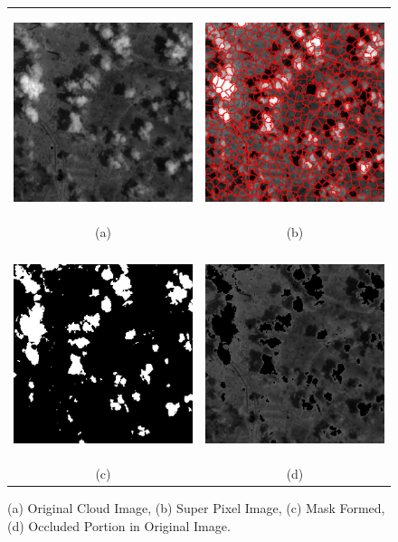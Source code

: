 \documentclass[a4paper, 15pt]{article}
\begin{document}
	\begin{figure}[!h]
		\centering 
		\begin{tabular}{cc}
			\includegraphics[width=6cm, height=6cm]{cloudSample.png} &\hspace{-8pt}
			\includegraphics[width=6cm, height=6cm]{patches.jpg}\\
			(a) & (b) \\ \\
			\includegraphics[width=6cm, height=6cm]{cloudMask.jpg} &\hspace{-8pt}
			\includegraphics[width=6cm, height=6cm]{final.jpg}\\
			(c) & (d)
		\end{tabular}
		\caption{(a) Original Cloud Image, (b) Super Pixel Image, (c) Mask Formed, (d) Occluded Portion in Original Image.}
	\end{figure}
\end{document}
